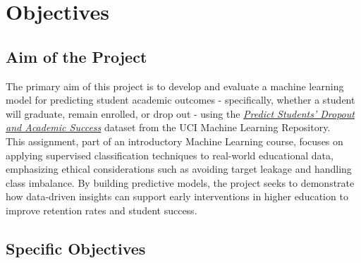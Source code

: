 \documentclass[twoside,final]{hcmut-report}
\begin{document}
\fancyfoot{}
\coverpage\clearpage

\tableofcontents\clearpage
\listoffigures\clearpage

\setcounter{page}{1}

\section{Objectives}

\subsection*{Aim of the Project}

The primary aim of this project is to develop and evaluate a machine learning model for predicting student academic outcomes - specifically, whether a student will graduate, remain enrolled, or drop out - using the \href{https://archive.ics.uci.edu/dataset/697/predict+students+dropout+and+academic+success}{\textit{Predict Students' Dropout and Academic Success}} dataset from the UCI Machine Learning Repository.\\

This assignment, part of an introductory Machine Learning course, focuses on applying supervised classification techniques to real-world educational data, emphasizing ethical considerations such as avoiding target leakage and handling class imbalance. By building predictive models, the project seeks to demonstrate how data-driven insights can support early interventions in higher education to improve retention rates and student success.

\subsection*{Specific Objectives}
\end{document}
